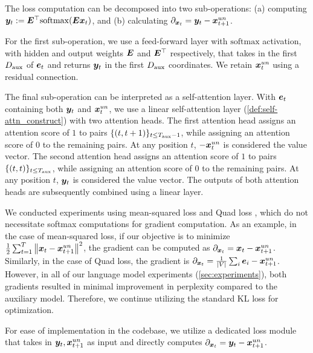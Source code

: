 The loss computation can be decomposed into two sub-operations: (a) computing ${\bm{y}}_t := {\bm{E}}^{\top} \mathrm{softmax} ( {\bm{E}} {\bm{x}}_t )$, and (b) calculating $\partial_{{\bm{x}}_t} = {\bm{y}}_t - {\bm{x}}^{un}_{t+1}$.

For the first sub-operation, we use a feed-forward layer with $\mathrm{softmax}$ activation, with hidden and output weights ${\bm{E}}$ and ${\bm{E}}^{\top}$ respectively, that takes in the first $D_{\text{aux}}$ of $\ve_t$ and returns ${\bm{y}}_t$ in the first $D_{\text{aux}}$ coordinates. We retain ${\bm{x}}_t^{un}$ using a residual connection.

The final sub-operation can be interpreted as a \simulator{} self-attention layer. With $\ve_t$ containing both ${\bm{y}}_t$ and ${\bm{x}}_t^{un}$, we use a linear self-attention layer (\cref{def:self-attn_construct}) with two attention heads. The first attention head assigns an attention score of $1$ to pairs $\{(t, t+1)\}_{t \le T_{\text{aux}} - 1}$, while assigning an attention score of $0$ to the remaining pairs. At any position $t$, $-{\bm{x}}^{un}_{t}$ is considered the value vector. The second attention head assigns an attention score of $1$ to pairs $\{(t, t)\}_{t \le T_{\text{aux}}}$, while assigning an attention score of $0$ to the remaining pairs. At any position $t$, ${\bm{y}}_{t}$ is considered the value vector. The outputs of both attention heads are subsequently combined using a linear layer.


\begin{remark}
We conducted experiments using mean-squared loss and Quad loss \cite{saunshi2020mathematical}, which do not necessitate softmax computations for gradient computation. As an example, in the case of mean-squared loss, if our objective is to minimize $\frac{1}{2} \sum_{t=1}^{T} \left\| {\bm{x}}_t - {\bm{x}}^{un}_{t+1} \right\|^2$, the gradient can be computed as $\partial_{{\bm{x}}_t} = {\bm{x}}_t - {\bm{x}}^{un}_{t+1}$. Similarly, in the case of Quad loss, the gradient is $\losspartial{\vx_t} = \frac{1}{\abs{V}} \sum_{i} \ve_i - \vx^{un}_{t+1}$. However, in all of our language model experiments (\cref{sec:experiments}), both gradients resulted in minimal improvement in perplexity compared to the auxiliary model. Therefore, we continue utilizing the standard KL loss for optimization.
\end{remark}

\begin{remark}
For ease of implementation in the codebase, we utilize a dedicated loss module that takes in ${\bm{y}}_t, {\bm{x}}^{un}_{t+1}$ as input and directly computes $\partial_{{\bm{x}}_t} = {\bm{y}}_t - {\bm{x}}^{un}_{t+1}$.
\end{remark}








